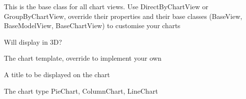 \documentclass[letterpaper,10pt,english]{sphinxmanual}
\begin{document}
\begin{fulllineitems}
\label{api:flask.ext.appbuilder.charts.views.BaseChartView}
This is the base class for all chart views.
Use DirectByChartView or GroupByChartView, override their properties and their base classes
(BaseView, BaseModelView, BaseChartView) to customise your charts

\begin{fulllineitems}
\label{api:flask.ext.appbuilder.charts.views.BaseChartView.chart_3d}
Will display in 3D?

\end{fulllineitems}


\begin{fulllineitems}
\label{api:flask.ext.appbuilder.charts.views.BaseChartView.chart_template}
The chart template, override to implement your own

\end{fulllineitems}


\begin{fulllineitems}
\label{api:flask.ext.appbuilder.charts.views.BaseChartView.chart_title}
A title to be displayed on the chart

\end{fulllineitems}


\begin{fulllineitems}
\label{api:flask.ext.appbuilder.charts.views.BaseChartView.chart_type}
The chart type PieChart, ColumnChart, LineChart

\end{fulllineitems}



\end{fulllineitems}
\end{document}
